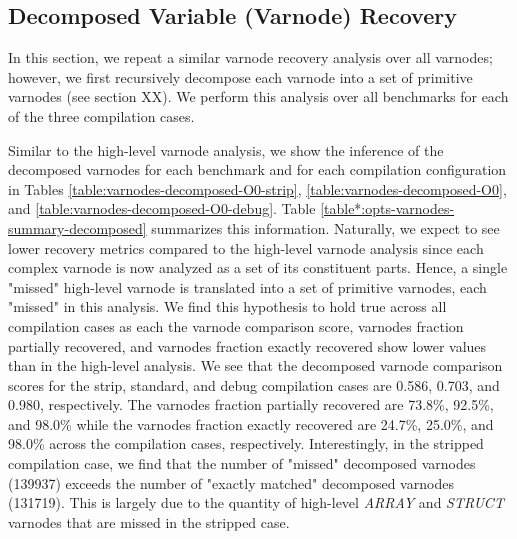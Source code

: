 \documentclass[conference]{IEEEtran}
\begin{document}
\subsection{Decomposed Variable (Varnode) Recovery}

In this section, we repeat a similar varnode recovery analysis over all varnodes; however, we first recursively decompose each varnode into a set of primitive varnodes (see section XX). We perform this analysis over all benchmarks for each of the three compilation cases.



Similar to the high-level varnode analysis, we show the inference of the decomposed varnodes for each benchmark and for each compilation configuration in Tables \ref{table:varnodes-decomposed-O0-strip}, \ref{table:varnodes-decomposed-O0}, and \ref{table:varnodes-decomposed-O0-debug}. Table \ref{table*:opts-varnodes-summary-decomposed} summarizes this information. Naturally, we expect to see lower recovery metrics compared to the high-level varnode analysis since each complex varnode is now analyzed as a set of its constituent parts. Hence, a single "missed" high-level varnode is translated into a set of primitive varnodes, each "missed" in this analysis. We find this hypothesis to hold true across all compilation cases as each the varnode comparison score, varnodes fraction partially recovered, and varnodes fraction exactly recovered show lower values than in the high-level analysis. We see that the decomposed varnode comparison scores for the strip, standard, and debug compilation cases are 0.586, 0.703, and 0.980, respectively. The varnodes fraction partially recovered are 73.8\%, 92.5\%, and 98.0\% while the varnodes fraction exactly recovered are 24.7\%, 25.0\%, and 98.0\% across the compilation cases, respectively. Interestingly, in the stripped compilation case, we find that the number of "missed" decomposed varnodes (139937) exceeds the number of "exactly matched" decomposed varnodes (131719). This is largely due to the quantity of high-level \emph{ARRAY} and \emph{STRUCT} varnodes that are missed in the stripped case.


\end{document}
